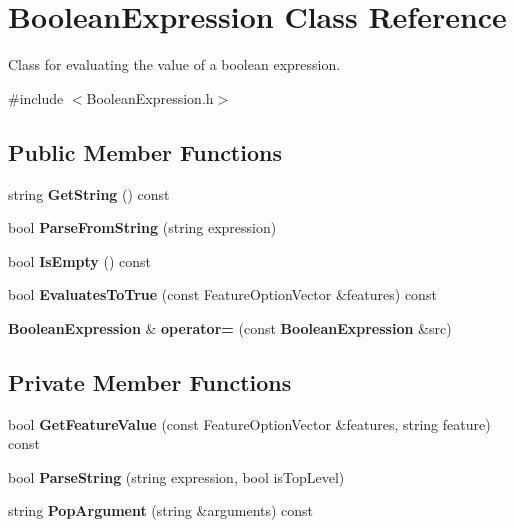 \section{BooleanExpression Class Reference}
\label{classBooleanExpression}


Class for evaluating the value of a boolean expression.  




{\ttfamily \#include $<$BooleanExpression.h$>$}

\subsection*{Public Member Functions}
\begin{DoxyCompactItemize}
\item 
string {\bf GetString} () const 
\item 
bool {\bf ParseFromString} (string expression)
\item 
bool {\bf IsEmpty} () const 
\item 
bool {\bf EvaluatesToTrue} (const FeatureOptionVector \&features) const 
\item 
{\bf BooleanExpression} \& {\bf operator=} (const {\bf BooleanExpression} \&src)
\end{DoxyCompactItemize}
\subsection*{Private Member Functions}
\begin{DoxyCompactItemize}
\item 
bool {\bf GetFeatureValue} (const FeatureOptionVector \&features, string feature) const 
\item 
bool {\bf ParseString} (string expression, bool isTopLevel)
\item 
string {\bf PopArgument} (string \&arguments) const 
\end{DoxyCompactItemize}
